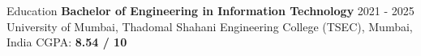 \documentclass{resume} %
\begin{document}
\vspace{-1.0em}


\begin{rSection}{Education}
    {\bf Bachelor of Engineering in Information Technology} \hfill {2021 - 2025 } \\
    University of Mumbai, Thadomal Shahani Engineering College (TSEC), Mumbai, India  \hfill CGPA: {\bf 8.54 / 10}

\end{rSection}
\end{document}
